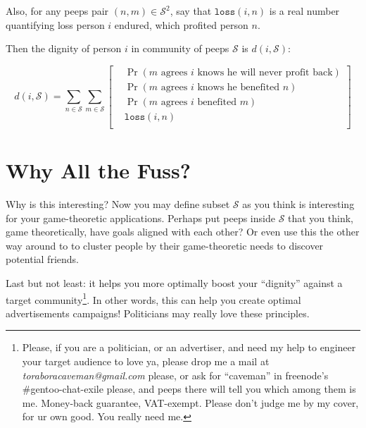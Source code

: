 \documentclass{report}
\begin{document}
Also, for any peeps pair $(n,m) \in \mathcal{S}^2$, say that
$\texttt{loss}(i,n)$ is a real number quantifying loss person $i$ endured,
which profited person $n$.

Then the dignity of person $i$ in community of peeps $\mathcal{S}$ is
$d(i,\mathcal{S})$:

$$
d(i,\mathcal{S}) = 
\sum_{n \in \mathcal{S}}
\sum_{m \in \mathcal{S}}
\left[
\begin{split}
&\Pr(\text{$m$ agrees $i$ knows he will never profit back})\\
&\Pr(\text{$m$ agrees $i$ knows he benefited $n$})\\
&\Pr(\text{$m$ agrees $i$ benefited $m$})\\
&\texttt{loss}(i,n)\\
\end{split}
\right]
$$

\section{Why All the Fuss?}
Why is this interesting? Now you may define subset $\mathcal{S}$ as you think
is interesting for your game-theoretic applications. Perhaps put peeps inside
$\mathcal{S}$ that you think, game theoretically, have goals aligned with each
other? Or even use this the other way around to to cluster people by their
game-theoretic needs to discover potential friends.

Last but not least: it helps you more optimally boost your ``dignity'' against a
target community\footnote{Please, if you are a politician, or an advertiser,
and need my help to engineer your target audience to love ya, please drop me a
mail at \emph{toraboracaveman@gmail.com} please, or ask for ``caveman'' in
freenode's \#gentoo-chat-exile please, and peeps there will tell you which
among them is me. Money-back guarantee, VAT-exempt. Please don't judge me by my cover, for
ur own good. You really need me.}. In other words, this can help you create
optimal advertisements campaigns! Politicians may really love these principles.
\end{document}
